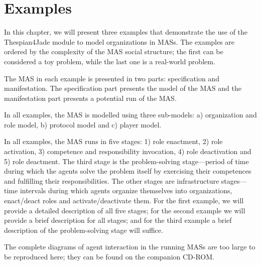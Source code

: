 
\chapter{Examples}

In this chapter, we will present three examples that demonstrate the use of the Thespian4Jade module to model organizations in MASs.
The examples are ordered by the complexity of the MAS social structure; the first can be considered a toy problem, while the last one is a real-world problem.

The MAS in each example is presented in two parts: specification and manifestation.
The specification part presents the model of the MAS and the manifestation part presents a potential run of the MAS.

In all examples, the MAS is modelled using three sub-models: a) organization and role model, b) protocol model and c) player model.

In all examples, the MAS runs in five stages: 1) role enactment, 2) role activation, 3) competence and responsibility invocation, 4) role deactivation and 5) role deactment.
The third stage is the problem-solving stage---period of time during which the agents solve the problem itself by exercising their competences and fulfilling their responsibilities.
The other stages are infrastructure stages---time intervals during which agents organize themselves into organizations, enact/deact roles and activate/deactivate them.
For the first example, we will provide a detailed description of all five stages; for the second example we will provide a brief description for all stages; and for the third example a brief description of the problem-solving stage will suffice.

The complete diagrams of agent interaction in the running MASs are too large to be reproduced here; they can be found on the companion CD-ROM. 





